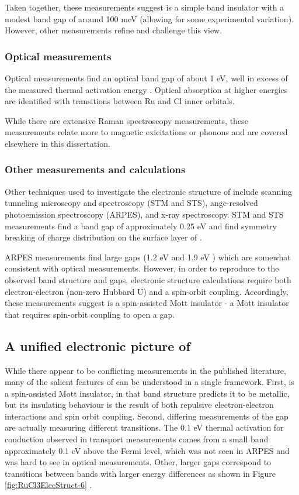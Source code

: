 Taken together, these measurements suggest \rucl is a simple band insulator with a modest band gap of around 100 meV (allowing for some experimental variation). However, other measurements refine and challenge this view.

\subsubsection{Optical measurements}
Optical measurements find an optical band gap of about 1 eV, well in excess of the measured thermal activation energy \cite{Sandilands2016}. Optical absorption at higher energies are identified with transitions between Ru and Cl inner orbitals.

While there are extensive Raman spectroscopy measurements, these measurements relate more to magnetic exicitations or phonons and are covered elsewhere in this dissertation.

\subsubsection{Other measurements and calculations}
Other techniques used to investigate the electronic structure of \rucl include scanning tunneling microscopy and spectroscopy (STM and STS), ange-resolved photoemission spectroscopy (ARPES), and x-ray spectroscopy. STM and STS measurements find a band gap of approximately 0.25 eV and find symmetry breaking of charge distribution on the surface layer of \rucl \cite{Ziatdinov2016}.

ARPES measurements find large gaps (1.2 eV \cite{Zhou2016} and 1.9 eV \cite{Sinn2016}) which are somewhat consistent with optical measurements. However, in order to reproduce to the observed band structure and gaps, electronic structure calculations require both electron-electron (non-zero Hubbard U) and a spin-orbit coupling. Accordingly, these measurements suggest \rucl is a spin-assisted Mott insulator - a Mott insulator that requires spin-orbit coupling to open a gap.


\subsection{A unified electronic picture of \texorpdfstring{\rucl}{RuCl3}}
While there appear to be conflicting measurements in the published literature, many of the salient features of \rucl can be understood in a single framework. First, \rucl is a spin-assisted Mott insulator, in that band structure predicts it to be metallic, but its insulating behaviour is the result of both repulsive electron-electron interactions and spin orbit coupling. Second, differing measurements of the gap are actually measuring different transitions. The 0.1 eV thermal activation for conduction observed in transport measurements comes from a small band approximately 0.1 eV above the Fermi level, which was not seen in ARPES and was hard to see in optical measurements. Other, larger gaps correspond to transitions between bands with larger energy differences as shown in Figure \ref{fig:RuCl3ElecStruct-6} \cite{Plumb2014}.

